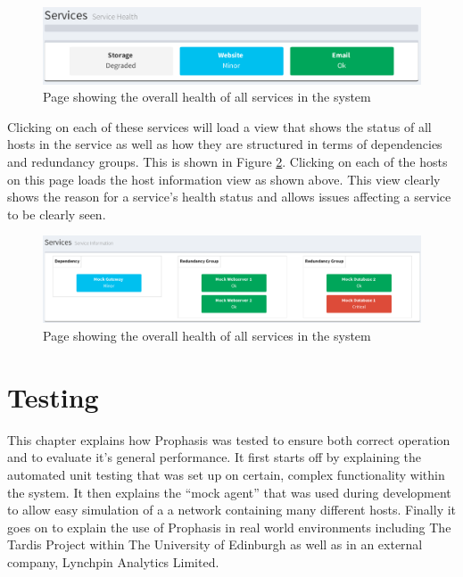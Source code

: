 \documentclass[bsc,deptreport,twoside,parskip,singlespacing,notimes]{infthesis}
\begin{document}
\begin{figure}[H]
	\centering
	\caption{Page showing the overall health of all services in the system}
	\label{service-health-index}
	\includegraphics[scale=0.6]{assets/screenshots/service-health-index.pdf}
\end{figure}


	Clicking on each of these services will load a view that shows the status of
	all hosts in the service as well as how they are structured in terms of
	dependencies and redundancy groups.  This is shown in Figure
	\ref{service-information}.  Clicking on each of the hosts on this page loads
	the host information view as shown above.  This view clearly shows the reason
	for a service's health status and allows issues affecting a service to be
	clearly seen.

\begin{figure}[H]
	\centering
	\caption{Page showing the overall health of all services in the system}
	\label{service-information}
	\includegraphics[scale=0.44]{assets/screenshots/service-information.pdf}
\end{figure}


\chapter{Testing}
	This chapter explains how Prophasis was tested to ensure both correct operation
	and to evaluate it's general performance.  It first starts off by explaining
	the automated unit testing that was set up on certain, complex functionality
	within the system.  It then explains the ``mock agent'' that was used during
	development to allow easy simulation of a a network containing many different
	hosts.  Finally it goes on to explain the use of Prophasis in real world 
	environments including The Tardis Project within The University of Edinburgh
	as well as in an external company, Lynchpin Analytics Limited.
\end{document}
